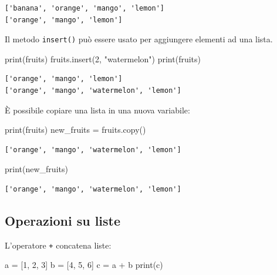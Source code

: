 \documentclass[
  letterpaper,
  krantz2]{{[}./krantz{]}}
\newenvironment{Shaded}{\begin{snugshade}}{\end{snugshade}}
\newcommand{\BuiltInTok}[1]{\textcolor[rgb]{0.00,0.23,0.31}{#1}}
\newcommand{\DecValTok}[1]{\textcolor[rgb]{0.68,0.00,0.00}{#1}}
\newcommand{\NormalTok}[1]{\textcolor[rgb]{0.00,0.23,0.31}{#1}}
\newcommand{\OperatorTok}[1]{\textcolor[rgb]{0.37,0.37,0.37}{#1}}
\newcommand{\StringTok}[1]{\textcolor[rgb]{0.13,0.47,0.30}{#1}}
\begin{document}
\begin{verbatim}
['banana', 'orange', 'mango', 'lemon']
['orange', 'mango', 'lemon']
\end{verbatim}

Il metodo \texttt{insert()} può essere usato per aggiungere elementi ad
una lista.

\begin{Shaded}
\begin{Highlighting}[]
\BuiltInTok{print}\NormalTok{(fruits)}
\NormalTok{fruits.insert(}\DecValTok{2}\NormalTok{, }\StringTok{"watermelon"}\NormalTok{)}
\BuiltInTok{print}\NormalTok{(fruits)}
\end{Highlighting}
\end{Shaded}

\begin{verbatim}
['orange', 'mango', 'lemon']
['orange', 'mango', 'watermelon', 'lemon']
\end{verbatim}

È possibile copiare una lista in una nuova variabile:

\begin{Shaded}
\begin{Highlighting}[]
\BuiltInTok{print}\NormalTok{(fruits)}
\NormalTok{new\_fruits }\OperatorTok{=}\NormalTok{ fruits.copy()}
\end{Highlighting}
\end{Shaded}

\begin{verbatim}
['orange', 'mango', 'watermelon', 'lemon']
\end{verbatim}

\begin{Shaded}
\begin{Highlighting}[]
\BuiltInTok{print}\NormalTok{(new\_fruits)}
\end{Highlighting}
\end{Shaded}

\begin{verbatim}
['orange', 'mango', 'watermelon', 'lemon']
\end{verbatim}

\subsection{Operazioni su liste}\label{operazioni-su-liste}

L'operatore \texttt{+} concatena liste:

\begin{Shaded}
\begin{Highlighting}[]
\NormalTok{a }\OperatorTok{=}\NormalTok{ [}\DecValTok{1}\NormalTok{, }\DecValTok{2}\NormalTok{, }\DecValTok{3}\NormalTok{]}
\NormalTok{b }\OperatorTok{=}\NormalTok{ [}\DecValTok{4}\NormalTok{, }\DecValTok{5}\NormalTok{, }\DecValTok{6}\NormalTok{]}
\NormalTok{c }\OperatorTok{=}\NormalTok{ a }\OperatorTok{+}\NormalTok{ b}
\BuiltInTok{print}\NormalTok{(c)}
\end{Highlighting}
\end{Shaded}
\end{document}
